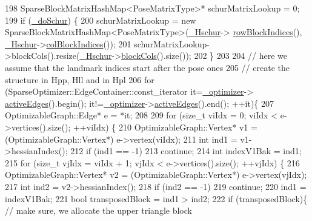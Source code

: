 \begin{DoxyCode}
198   SparseBlockMatrixHashMap<PoseMatrixType>* schurMatrixLookup = 0;
199   \textcolor{keywordflow}{if} (\hyperlink{classg2o_1_1BlockSolver_ab375a5fac964182442f38288bd8a103a}{\_doSchur}) \{
200     schurMatrixLookup = \textcolor{keyword}{new} SparseBlockMatrixHashMap<PoseMatrixType>(\hyperlink{classg2o_1_1BlockSolver_a46977934a3e4fb0cd36bc4181ed3ec0e}{\_Hschur}->
      \hyperlink{classg2o_1_1SparseBlockMatrix_ab9f9e621c9bca7c660c61b3948b8ece3}{rowBlockIndices}(), \hyperlink{classg2o_1_1BlockSolver_a46977934a3e4fb0cd36bc4181ed3ec0e}{\_Hschur}->\hyperlink{classg2o_1_1SparseBlockMatrix_adfaf13a5f3134205a58c8346a09a672a}{colBlockIndices}());
201     schurMatrixLookup->blockCols().resize(\hyperlink{classg2o_1_1BlockSolver_a46977934a3e4fb0cd36bc4181ed3ec0e}{\_Hschur}->\hyperlink{classg2o_1_1SparseBlockMatrix_a8e53797223fff106487d0b0080a3e36e}{blockCols}().size());
202   \}
203 
204   \textcolor{comment}{// here we assume that the landmark indices start after the pose ones}
205   \textcolor{comment}{// create the structure in Hpp, Hll and in Hpl}
206   \textcolor{keywordflow}{for} (SparseOptimizer::EdgeContainer::const\_iterator it=\hyperlink{classg2o_1_1Solver_aff3275985d996329df15070348c21292}{\_optimizer}->
      \hyperlink{classg2o_1_1SparseOptimizer_aef20b7dd401862d572a851349d1bc124}{activeEdges}().begin(); it!=\hyperlink{classg2o_1_1Solver_aff3275985d996329df15070348c21292}{\_optimizer}->\hyperlink{classg2o_1_1SparseOptimizer_aef20b7dd401862d572a851349d1bc124}{activeEdges}().end(); ++it)\{
207     OptimizableGraph::Edge* e = *it;
208 
209     \textcolor{keywordflow}{for} (\textcolor{keywordtype}{size\_t} viIdx = 0; viIdx < e->vertices().size(); ++viIdx) \{
210       OptimizableGraph::Vertex* v1 = (OptimizableGraph::Vertex*) e->vertex(viIdx);
211       \textcolor{keywordtype}{int} ind1 = v1->hessianIndex();
212       \textcolor{keywordflow}{if} (ind1 == -1)
213         \textcolor{keywordflow}{continue};
214       \textcolor{keywordtype}{int} indexV1Bak = ind1;
215       \textcolor{keywordflow}{for} (\textcolor{keywordtype}{size\_t} vjIdx = viIdx + 1; vjIdx < e->vertices().size(); ++vjIdx) \{
216         OptimizableGraph::Vertex* v2 = (OptimizableGraph::Vertex*) e->vertex(vjIdx);
217         \textcolor{keywordtype}{int} ind2 = v2->hessianIndex();
218         \textcolor{keywordflow}{if} (ind2 == -1)
219           \textcolor{keywordflow}{continue};
220         ind1 = indexV1Bak;
221         \textcolor{keywordtype}{bool} transposedBlock = ind1 > ind2;
222         \textcolor{keywordflow}{if} (transposedBlock)\{ \textcolor{comment}{// make sure, we allocate the upper triangle block}

\end{DoxyCode}
